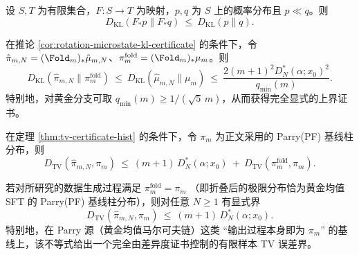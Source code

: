

\begin{lemma}\label{lem:kl-monotone-pushforward}
设 $S,T$ 为有限集合，$F:S\to T$ 为映射，$p,q$ 为 $S$ 上的概率分布且 $p\ll q$。则
\[
D_{\mathrm{KL}}(F_*p\|F_*q)\ \le\ D_{\mathrm{KL}}(p\|q).
\]
\end{lemma}

\begin{corollary}[折叠后稳定类型的 KL 证书]\label{cor:rotation-folded-kl-certificate}
在推论 \ref{cor:rotation-microstate-kl-certificate} 的条件下，令 $\hat\pi_{m,N}=(\Fold_m)_*\hat\mu_{m,N}$、$\pi_m^{\mathrm{fold}}=(\Fold_m)_*\mu_m$。则
\[
D_{\mathrm{KL}}(\hat\pi_{m,N}\|\pi_m^{\mathrm{fold}})\ \le\ D_{\mathrm{KL}}(\hat\mu_{m,N}\|\mu_m)\ \le\ \frac{2(m+1)^2D_N^*(\alpha;x_0)^2}{q_{\min}(m)}.
\]
特别地，对黄金分支可取 $q_{\min}(m)\ge 1/(\sqrt5\,m)$，从而获得完全显式的上界证书。
\end{corollary}



\begin{corollary}\label{cor:tv-decomposition-parry}
在定理 \ref{thm:tv-certificate-hist} 的条件下，令 $\pi_m$ 为正文采用的 Parry(PF) 基线柱分布，则
\[
D_{\mathrm{TV}}(\hat{\pi}_{m,N},\pi_m)
\ \le\
(m+1)\,D_N^*(\alpha;x_0)\ +\ D_{\mathrm{TV}}(\pi_m^{\mathrm{fold}},\pi_m).
\]
\end{corollary}

\begin{corollary}\label{cor:tv-to-parry-when-gap-zero}
若对所研究的数据生成过程满足
\(
\pi_m^{\mathrm{fold}}=\pi_m
\)
（即折叠后的极限分布恰为黄金均值 SFT 的 Parry(PF) 基线柱分布），则对任意 $N\ge 1$ 有显式界
\[
D_{\mathrm{TV}}(\hat{\pi}_{m,N},\pi_m)\ \le\ (m+1)\,D_N^*(\alpha;x_0).
\]
特别地，在 Parry 源（黄金均值马尔可夫链）这类 ``输出过程本身即为 $\pi_m$'' 的基线上，该不等式给出一个完全由差异度证书控制的有限样本 TV 误差界。
\end{corollary}

